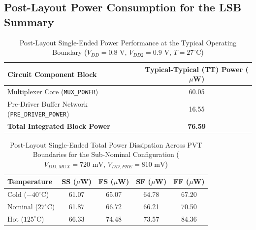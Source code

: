 \subsection{Post-Layout Power Consumption for the LSB Summary }
\begin{table}[H]
    \centering
    \renewcommand{\arraystretch}{1.3}
    \setlength{\tabcolsep}{14pt}
    \small
    \begin{tabular}{|l|c|}
        \hline
        \textbf{Circuit Component Block} & \textbf{Typical-Typical (TT) Power ($\mu$W)} \\ \hline
        Multiplexer Core (\texttt{MUX\_POWER}) & 60.05 \\ \hline
        Pre-Driver Buffer Network (\texttt{PRE\_DRIVER\_POWER}) & 16.55 \\ \hline
        \textbf{Total Integrated Block Power} & \textbf{76.59} \\ \hline
    \end{tabular}
    \vspace{2mm}
    \caption{Post-Layout Single-Ended Power Performance at the Typical Operating Boundary ($V_{DD} = 0.8\text{ V}$, $V_{DD2} = 0.9\text{ V}$, $T = 27^{\circ}\text{C}$)}
    \label{tab:post_layout_tt_power}
\end{table}




\begin{table}[H]
    \centering
    \renewcommand{\arraystretch}{1.3}
    \setlength{\tabcolsep}{12pt}
    \small
    \begin{tabular}{|l|c|c|c|c|}
        \hline
        \textbf{Temperature} & \textbf{SS ($\mu$W)} & \textbf{FS ($\mu$W)} & \textbf{SF ($\mu$W)} & \textbf{FF ($\mu$W)} \\ \hline
        Cold ($-40^\circ\text{C}$) & 61.07 & 65.07 & 64.78 & 67.20 \\ \hline
        Nominal ($27^\circ\text{C}$) & 61.87 & 66.72 & 66.21 & 70.50 \\ \hline
        Hot ($125^\circ\text{C}$) & 66.33 & 74.48 & 73.57 & 84.36 \\ \hline
    \end{tabular}
    \vspace{2mm}
    \caption{Post-Layout Single-Ended Total Power Dissipation Across PVT Boundaries for the Sub-Nominal Configuration ($V_{DD,MUX} = 720\text{ mV}$, $V_{DD,PRE} = 810\text{ mV}$)}
    \label{tab:post_layout_subnominal_power}
\end{table}

